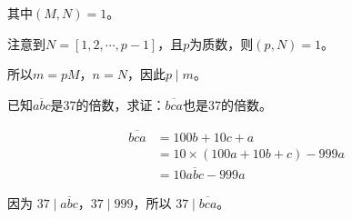 \documentclass[a4paper,answers]{exam}
\begin{document}
\begin{questions}
\begin{solution}[\stretch{1}]
    其中\(\left(M,N\right)=1\)。

    注意到\(N = \left[1,2,\cdots,p-1\right]\)，且\(p\)为质数，则\(\left(p,N\right)=1\)。

    所以\(m = pM\)，\(n = N\)，因此\(p \mid m\)。
\end{solution}

\question

已知\(\overline{abc}\)是\(37\)的倍数，求证：\(\overline{bca}\)也是\(37\)的倍数。

\begin{solution}[\stretch{1}]
    \[
        \begin{aligned}
            \overline{bca} &= 100b+10c+a \\
            &= 10 \times \left(100a+10b+c\right) - 999a \\
            &= 10 \overline{abc} - 999a
        \end{aligned}
    \]

    因为 \(37 \mid \overline{abc}\)，\(37 \mid 999\)，所以 \(37 \mid \overline{bca}\)。
\end{solution}

\end{questions}
\end{document}
